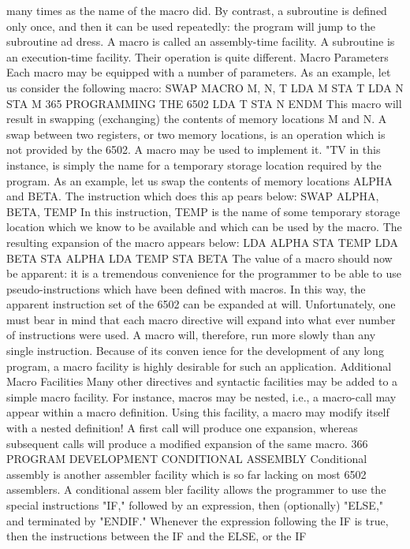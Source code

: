 \documentclass{book}
\begin{document}
{{{{{{{{{{{{{{{{{{{{{{{{{{{{{{{{{{{{{{{{{{{{{{{{{{{{{{{{{{{{{{{{{{{{{{{{{{{{{{{{{{{{{{{{{{{{{{{{{{{{{{{{{{{{{{{{{{{{{{{{{{{{{{{{{{{{{{{{{{{{many times as the name of the macro did.
By contrast, a subroutine is defined only once, and then it can
be used repeatedly: the program will jump to the subroutine ad
dress. A macro is called an assembly-time facility. A subroutine is
an execution-time facility. Their operation is quite different.
Macro Parameters
Each macro may be equipped with a number of parameters. As
an example, let us consider the following macro:
SWAP MACRO M, N, T
LDA M
STA T
LDA N
STA M
365
PROGRAMMING THE 6502
LDA T
STA N
ENDM
This macro will result in swapping (exchanging) the contents of
memory locations M and N. A swap between two registers, or two
memory locations, is an operation which is not provided by the
6502. A macro may be used to implement it. "TV in this instance,
is simply the name for a temporary storage location required by
the program. As an example, let us swap the contents of memory
locations ALPHA and BETA. The instruction which does this ap
pears below:
SWAP ALPHA, BETA, TEMP
In this instruction, TEMP is the name of some temporary storage
location which we know to be available and which can be used by
the macro. The resulting expansion of the macro appears below:
LDA ALPHA
STA TEMP
LDA BETA
STA ALPHA
LDA TEMP
STA BETA
The value of a macro should now be apparent: it is a tremendous
convenience for the programmer to be able to use pseudo-instructions
which have been defined with macros. In this way, the apparent
instruction set of the 6502 can be expanded at will. Unfortunately,
one must bear in mind that each macro directive will expand into what
ever number of instructions were used. A macro will, therefore, run
more slowly than any single instruction. Because of its conven
ience for the development of any long program, a macro facility
is highly desirable for such an application.
Additional Macro Facilities
Many other directives and syntactic facilities may be added to a
simple macro facility. For instance, macros may be nested, i.e., a
macro-call may appear within a macro definition. Using this facility,
a macro may modify itself with a nested definition! A first call will
produce one expansion, whereas subsequent calls will produce a
modified expansion of the same macro.
366
PROGRAM DEVELOPMENT
CONDITIONAL ASSEMBLY
Conditional assembly is another assembler facility which is
so far lacking on most 6502 assemblers. A conditional assem
bler facility allows the programmer to use the special instructions
"IF," followed by an expression, then (optionally) "ELSE," and
terminated by "ENDIF." Whenever the expression following the IF
is true, then the instructions between the IF and the ELSE, or the IF
}}}}}}}}}}}}}}}}}}}}}}}}}}}}}}}}}}}}}}}}}}}}}}}}}}}}}}}}}}}}}}}}}}}}}}}}}}}}}}}}}}}}}}}}}}}}}}}}}}}}}}}}}}}}}}}}}}}}}}}}}}}}}}}}}}}}}}}}}}}}
\end{document}
